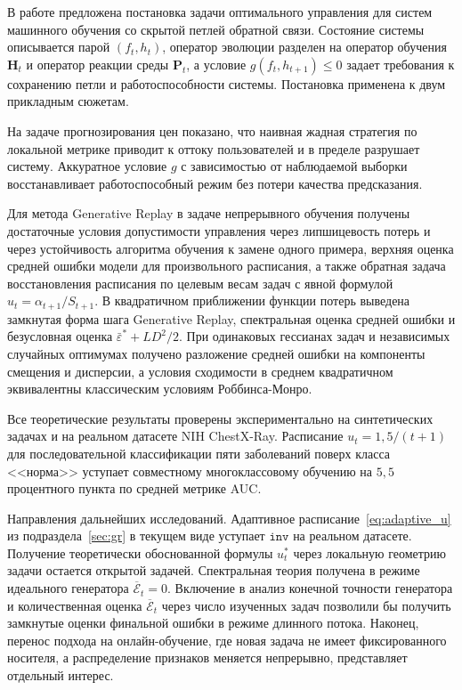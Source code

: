 \documentclass[a4paper,14pt,oneside,openany]{extarticle}
\newcommand{\bH}{\mathbf{H}}
\newcommand{\bP}{\mathbf{P}}
\newcommand{\cE}{\mathcal{E}}
\begin{document}
В работе предложена постановка задачи оптимального управления для систем машинного обучения со скрытой петлей обратной связи. Состояние системы описывается парой $(f_t, h_t)$, оператор эволюции разделен на оператор обучения $\bH_t$ и оператор реакции среды $\bP_t$, а условие $g(f_t, h_{t+1}) \le 0$ задает требования к сохранению петли и работоспособности системы. Постановка применена к двум прикладным сюжетам.

На задаче прогнозирования цен показано, что наивная жадная стратегия по локальной метрике приводит к оттоку пользователей и в пределе разрушает систему. Аккуратное условие $g$ с зависимостью от наблюдаемой выборки восстанавливает работоспособный режим без потери качества предсказания.

Для метода Generative Replay в задаче непрерывного обучения получены достаточные условия допустимости управления через липшицевость потерь и через устойчивость алгоритма обучения к замене одного примера, верхняя оценка средней ошибки модели для произвольного расписания, а также обратная задача восстановления расписания по целевым весам задач с явной формулой $u_t = \alpha_{t+1}/S_{t+1}$. В квадратичном приближении функции потерь выведена замкнутая форма шага Generative Replay, спектральная оценка средней ошибки и безусловная оценка $\bar\varepsilon^* + LD^2/2$. При одинаковых гессианах задач и независимых случайных оптимумах получено разложение средней ошибки на компоненты смещения и дисперсии, а условия сходимости в среднем квадратичном эквивалентны классическим условиям Роббинса-Монро.

Все теоретические результаты проверены экспериментально на синтетических задачах и на реальном датасете NIH ChestX-Ray. Расписание $u_t = 1{,}5/(t+1)$ для последовательной классификации пяти заболеваний поверх класса <<норма>> уступает совместному многоклассовому обучению на $5{,}5$ процентного пункта по средней метрике AUC.

Направления дальнейших исследований. Адаптивное расписание~\eqref{eq:adaptive_u} из подраздела~\ref{sec:gr} в текущем виде уступает $\texttt{inv}$ на реальном датасете. Получение теоретически обоснованной формулы $u_t^*$ через локальную геометрию задачи остается открытой задачей. Спектральная теория получена в режиме идеального генератора $\overline{\cE}_t = 0$. Включение в анализ конечной точности генератора и количественная оценка $\overline{\cE}_t$ через число изученных задач позволили бы получить замкнутые оценки финальной ошибки в режиме длинного потока. Наконец, перенос подхода на онлайн-обучение, где новая задача не имеет фиксированного носителя, а распределение признаков меняется непрерывно, представляет отдельный интерес.
\end{document}
